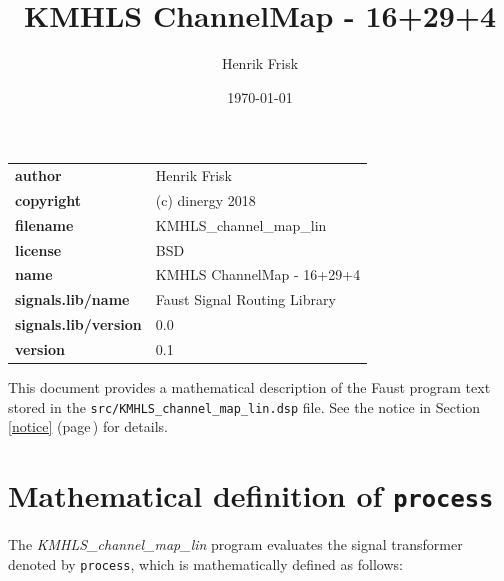 \documentclass{article}
\newcommand{\faustfilename}{src/KMHLS\_channel\_map\_lin.dsp}
\newcommand{\faustprogname}{KMHLS\_channel\_map\_lin}
\begin{document}
\title{KMHLS ChannelMap - 16+29+4} \author{ Henrik Frisk } \date{\today} \maketitle \begin{tabular}{ll}  \hline  \textbf{author} &  Henrik Frisk  \\  \textbf{copyright} & (c) dinergy 2018  \\  \textbf{filename} & KMHLS\_channel\_map\_lin \\  \textbf{license} &  BSD  \\  \textbf{name} & KMHLS ChannelMap - 16+29+4 \\  \textbf{signals.lib/name} & Faust Signal Routing Library \\  \textbf{signals.lib/version} & 0.0 \\  \textbf{version} &  0.1  \\  \hline \end{tabular} \bigskip  \bigskip This document provides a mathematical description of the Faust program text stored in the \texttt{\faustfilename} file. See the notice in Section\,\ref{notice} (page\,\pageref{notice}) for details.   \section{Mathematical definition of \texttt{process}} \label{equation}  The \emph{\faustprogname} program evaluates the signal transformer denoted by \texttt{process}, which is mathematically defined as follows: 
\end{document}
